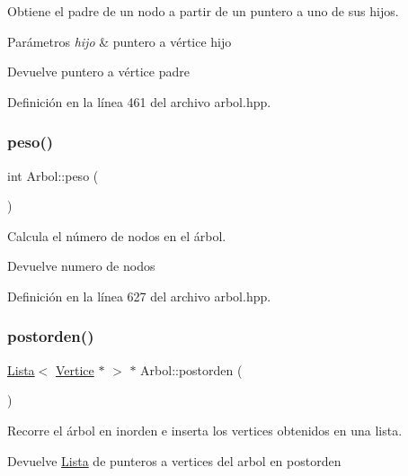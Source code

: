 Obtiene el padre de un nodo a partir de un puntero a uno de sus hijos. 


\begin{DoxyParams}{Parámetros}
{\em hijo} & puntero a vértice hijo \\
\hline
\end{DoxyParams}
\begin{DoxyReturn}{Devuelve}
puntero a vértice padre 
\end{DoxyReturn}


Definición en la línea 461 del archivo arbol.\+hpp.

\mbox{\label{classArbol_a9051a6b4120b42ff8d046f41ab73dbaa}} 
\subsubsection{\texorpdfstring{peso()}{peso()}}
{\footnotesize\ttfamily int Arbol\+::peso (\begin{DoxyParamCaption}{ }\end{DoxyParamCaption})}



Calcula el número de nodos en el árbol. 

\begin{DoxyReturn}{Devuelve}
numero de nodos 
\end{DoxyReturn}


Definición en la línea 627 del archivo arbol.\+hpp.

\mbox{\label{classArbol_a126e7d801dbe214ac39f183c26e9135d}} 
\subsubsection{\texorpdfstring{postorden()}{postorden()}}
{\footnotesize\ttfamily \hyperlink{classLista}{Lista}$<$ \hyperlink{classVertice}{Vertice} $\ast$ $>$ $\ast$ Arbol\+::postorden (\begin{DoxyParamCaption}{ }\end{DoxyParamCaption})}



Recorre el árbol en inorden e inserta los vertices obtenidos en una lista. 

\begin{DoxyReturn}{Devuelve}
\hyperlink{classLista}{Lista} de punteros a vertices del arbol en postorden 
\end{DoxyReturn}


